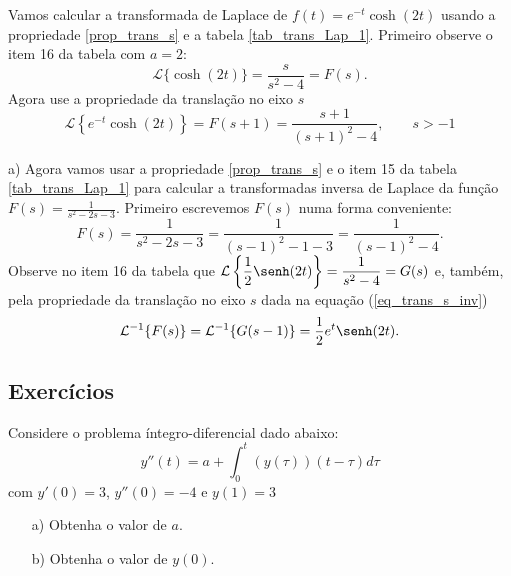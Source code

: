 \begin{ex}Vamos calcular a transformada de Laplace de $f(t)=e^{-t}\cosh(2t)$ usando a propriedade \ref{prop_trans_s} e a tabela \ref{tab_trans_Lap_1}. Primeiro observe o item 16 da tabela com $a=2$:
\begin{equation}
\mathcal{L}\{\cosh(2t)\}=\frac{s}{ s^2-4}=F(s).
\end{equation}
Agora use a propriedade da translação no eixo $s$
\begin{equation}
\mathcal{L}\left\{e^{-t}\cosh(2t)\right\} =F(s+1)=\frac{s+1}{ (s+1)^2-4},\qquad s>-1
\end{equation}
\end{ex}
\begin{ex}
 \item[a)] Agora vamos usar a propriedade \ref{prop_trans_s} e o item 15 da tabela \ref{tab_trans_Lap_1} para calcular a transformadas inversa de Laplace da função $F(s)=\frac{1}{s^2-2s-3}$. Primeiro escrevemos $F(s)$ numa forma conveniente:
\begin{equation}
F(s)=\frac{1}{s^2-2s-3}=\frac{1}{(s-1)^2-1-3}=\frac{1}{(s-1)^2-4}.
\end{equation}
Observe no item 16 da tabela que $\displaystyle\mathcal{L}\left\{\frac{1}{2}\senh(2t)\right\}=\frac{1}{ s^2-4}=G(s)$ e, também, pela propriedade da translação no eixo $s$ dada na equação (\ref{eq_trans_s_inv})
\begin{equation}
\mathcal{L}^{-1}\{F(s)\}=\mathcal{L}^{-1}\{G(s-1)\}=\frac{1}{2}e^{t}\senh(2t).
\end{equation}
\end{ex}
\subsection*{Exercícios}
\begin{exeresol}
  Considere o problema íntegro-diferencial dado abaixo:
$$ y''(t) = a+ \int_0^t(y(\tau))(t-\tau)d\tau $$
com $y'(0)=3$, $y''(0)=-4$ e $y(1)=3$

\begin{itemize}
\item[a)] Obtenha o valor de $a$.
\item[b)] Obtenha o valor de $y(0)$.
\end{itemize}
\end{exeresol}

